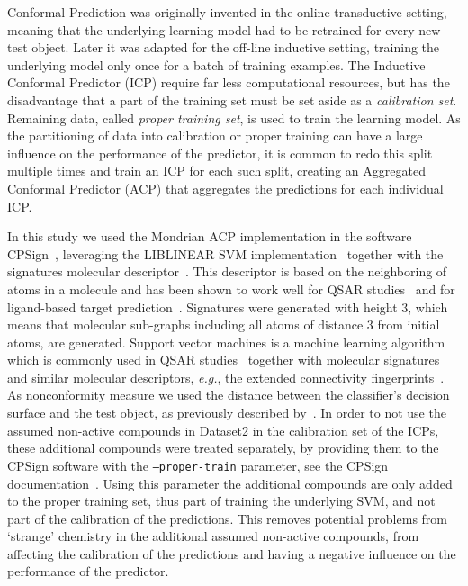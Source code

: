\documentclass[utf8]{frontiersSCNS} %
\begin{document}
Conformal Prediction was originally invented in the online transductive setting, meaning that the
underlying learning model had to be retrained for every new test object. Later it was adapted for
the off-line inductive setting, training the underlying model only once for a batch of training examples.
The Inductive Conformal Predictor (ICP) require far less computational resources, 
but has the disadvantage that a part of the training set must be set aside as a \textit{calibration set}.
Remaining data, called \textit{proper training set}, is used to train the learning model. 
As the partitioning of data into calibration or proper training can have a large influence on the performance
of the predictor, it is common to redo this split multiple times and train an ICP
for each such split, creating an Aggregated Conformal Predictor (ACP) that aggregates the predictions for 
each individual ICP.

In this study we used the Mondrian ACP implementation in the
software CPSign~\cite{CPSignDocs}, leveraging the
LIBLINEAR SVM implementation~\cite{fan2008liblinear} together with the
signatures molecular descriptor~\cite{faulon2003signature}.  This descriptor is
based on the neighboring of atoms in a molecule and has been shown to work
well for QSAR studies~\cite{lapins2018confidence,Alvarsson:2016pw} and for
ligand-based target prediction~\cite{alvarsson2014ligand}. Signatures were
generated with height 3, which means that molecular sub-graphs including all atoms
of distance 3 from initial atoms, are generated. Support vector
machines is a machine learning algorithm which is commonly used in QSAR
studies~\cite{norinder2003support,zhou2011qsar} together with molecular
signatures and similar molecular descriptors, \textit{e.g.}, the extended
connectivity fingerprints~\cite{rogers2010extended}. 
As nonconformity measure we used the distance between the classifier's 
decision surface and the test object, as previously described 
by~\cite{eklund2015application}. 
In order to not use the assumed non-active compounds in Dataset2 in the
calibration set of the ICPs, these additional compounds
were treated separately, by providing them to the CPSign software with the
\texttt{--proper-train} parameter, see the CPSign
documentation~\cite{CPSignDocs}. Using this parameter the additional
compounds are only added to the proper training set, thus part of training
the underlying SVM, and not part of the calibration of the predictions. This
removes potential problems from `strange' chemistry in the additional assumed
non-active compounds, from affecting the calibration of the predictions and having a
negative influence on the performance of the predictor.
\end{document}
